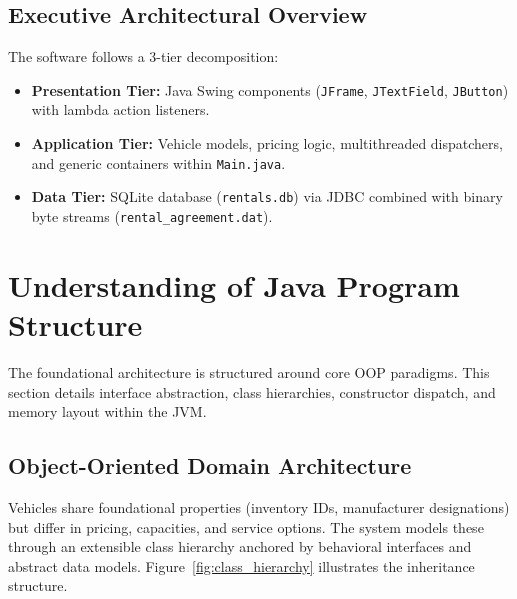 \documentclass[11pt,a4paper]{article}
\begin{document}
\subsection*{Executive Architectural Overview}
The software follows a 3-tier decomposition:
\begin{itemize}
    \item \textbf{Presentation Tier:} Java Swing components (\texttt{JFrame}, \texttt{JTextField}, \texttt{JButton}) with lambda action listeners.
    \item \textbf{Application Tier:} Vehicle models, pricing logic, multithreaded dispatchers, and generic containers within \texttt{Main.java}.
    \item \textbf{Data Tier:} SQLite database (\texttt{rentals.db}) via JDBC combined with binary byte streams (\texttt{rental\_agreement.dat}).
\end{itemize}

\newpage
\section{Understanding of Java Program Structure}
\label{sec:structure}

The foundational architecture is structured around core OOP paradigms. This section details interface abstraction, class hierarchies, constructor dispatch, and memory layout within the JVM.

\subsection{Object-Oriented Domain Architecture}
Vehicles share foundational properties (inventory IDs, manufacturer designations) but differ in pricing, capacities, and service options. The system models these through an extensible class hierarchy anchored by behavioral interfaces and abstract data models. Figure~\ref{fig:class_hierarchy} illustrates the inheritance structure.
\end{document}
